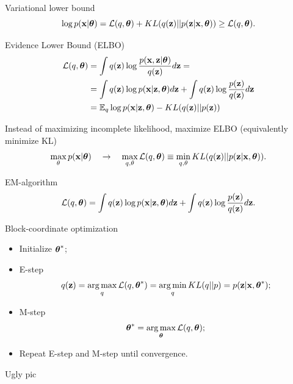 \begin{frame}{Variational lower bound}
\[
    \log p(\mathbf{x}| \boldsymbol{\theta}) = \mathcal{L} (q, \boldsymbol{\theta}) + KL(q(\mathbf{z}) || p(\mathbf{z}|\mathbf{x}, \boldsymbol{\theta})) \geq \mathcal{L} (q, \boldsymbol{\theta}).
\]
\begin{block}{Evidence Lower Bound (ELBO)}
\begin{align*}
    \mathcal{L} (q, \boldsymbol{\theta}) &= \int q(\mathbf{z}) \log \frac{p(\mathbf{x}, \mathbf{z} | \boldsymbol{\theta})}{q(\mathbf{z})}d\mathbf{z} = \\ 
    &= \int q(\mathbf{z}) \log p(\mathbf{x} | \mathbf{z}, \boldsymbol{\theta}) d\mathbf{z} + \int q(\mathbf{z}) \log \frac{p(\mathbf{z})}{q(\mathbf{z})}d\mathbf{z} \\ 
    &= \mathbb{E}_{q} \log p(\mathbf{x} | \mathbf{z}, \boldsymbol{\theta}) - KL (q(\mathbf{z}) || p(\mathbf{z}))
\end{align*}
\end{block}
Instead of maximizing incomplete likelihood, maximize ELBO (equivalently minimize KL)
\[
    \max_{\theta} p(\mathbf{x} | \boldsymbol{\theta}) \quad \rightarrow \quad \max_{q, \theta} \mathcal{L} (q, \boldsymbol{\theta}) \equiv \min_{q, \theta} KL(q(\mathbf{z}) || p(\mathbf{z}|\mathbf{x}, \boldsymbol{\theta})).
\]
    
\end{frame}
\begin{frame}{EM-algorithm}
	\[
		\mathcal{L} (q, \boldsymbol{\theta})  = \int q(\mathbf{z}) \log p(\mathbf{x} | \mathbf{z}, \boldsymbol{\theta}) d\mathbf{z} + \int q(\mathbf{z}) \log \frac{p(\mathbf{z})}{q(\mathbf{z})}d\mathbf{z}.
	\]
	\begin{block}{Block-coordinate optimization}
	\begin{itemize}
		\item Initialize $\boldsymbol{\theta}^*$;
		\item E-step
		\[
			q(\mathbf{z}) = \operatorname*{arg\,max}_q \mathcal{L} (q, \boldsymbol{\theta}^*) = \operatorname*{arg\,min}_q KL(q || p) =
			 p(\mathbf{z}| \mathbf{x}, \boldsymbol{\theta}^*);
		\]
		\item M-step
		\[
			\boldsymbol{\theta}^* = \operatorname*{arg\,max}_{\boldsymbol{\theta}} \mathcal{L} (q, \boldsymbol{\theta});
		\]
		\item Repeat E-step and M-step until convergence.
	\end{itemize}
	\end{block}
\end{frame}
\begin{frame}{Ugly pic}
\end{frame}
